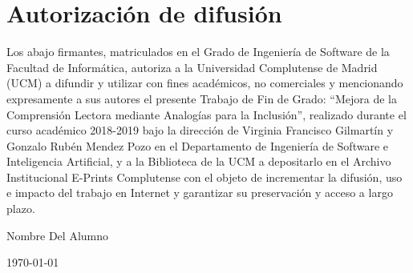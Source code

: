 \chapter*{Autorización de difusión}

   
Los abajo firmantes, matriculados en el Grado de Ingeniería de Software de la Facultad de Informática, autoriza a la Universidad Complutense de Madrid (UCM) a difundir y utilizar con fines académicos, no comerciales y mencionando expresamente a sus autores el presente Trabajo de Fin de Grado: ``Mejora de la Comprensión Lectora mediante Analogías para la Inclusión'', realizado durante el curso académico 2018-2019 bajo la dirección de Virginia Francisco Gilmartín y Gonzalo Rubén Mendez Pozo en el Departamento de Ingeniería de Software e Inteligencia Artificial, y a la Biblioteca de la UCM a depositarlo en el Archivo Institucional E-Prints Complutense con el objeto de incrementar la difusión, uso e impacto del trabajo en Internet y garantizar su preservación y acceso a largo plazo.

\vspace{5cm}

\begin{center}
	\large Nombre Del Alumno\\
	
	\vspace{0.5cm}
	
	
	\today\\
	
\end{center}
